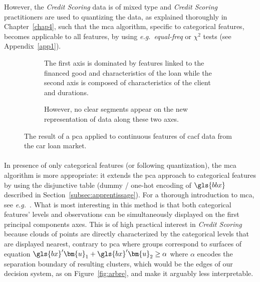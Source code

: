 However, the \textit{Credit Scoring} data is of mixed type and \textit{Credit Scoring} practitioners are used to quantizing the data, as explained thoroughly in Chapter~\ref{chap4}, such that the \gls{mca} algorithm, specific to categorical features, becomes applicable to all features, by using \textit{e.g.\ equal-freq} or $\chi^2$ tests (see Appendix~\ref{app1}).

\begin{figure}[!htb]
{\setlength{\parindent}{0cm}}
\begin{multicols}{2}
\centering
\begin{subfigure}[t]{0.45\textwidth}
\centering
\resizebox{\textwidth}{!}{}
\caption{\label{fig:pca1} The first axis is dominated by features linked to the financed good and characteristics of the loan while the second axis is composed of characteristics of the client and durations.}
\end{subfigure}%
\columnbreak
\hspace*{1cm} \begin{subfigure}[t]{0.45\textwidth}
\centering
\resizebox{\textwidth}{!}{}
\caption{\label{fig:pca2} However, no clear segments appear on the new representation of data along these two axes.}
\end{subfigure}
\end{multicols}
\caption{\label{fig:pca} The result of a \gls{pca} applied to continuous features of \gls{cacf} data from the car loan market.}
\end{figure}

\paragraph{}

In presence of only categorical features (or following quantization), the \gls{mca} algorithm is more appropriate: it extends the \gls{pca} approach to categorical features by using the disjunctive table (dummy / one-hot encoding of $\gls{bbx}$ described in Section~\ref{subsec:apprentissage}). For a thorough introduction to \gls{mca}, see \textit{e.g.}~\cite{lebart1995statistique}. What is most interesting in this method is that both categorical features' levels and observations can be simultaneously displayed on the first principal components axes.
This is of high practical interest in \textit{Credit Scoring} because clouds of points are directly characterized by the categorical levels that are displayed nearest, contrary to \gls{pca} where groups correspond to surfaces of equation $\gls{bx} ' \bm{u}_1 + \gls{bx} ' \bm{u}_2 \geq \alpha$ where $\alpha$ encodes the separation boundary of resulting clusters, which would be the edges of our decision system, as on Figure~\ref{fig:arbre}, and make it arguably less interpretable.

